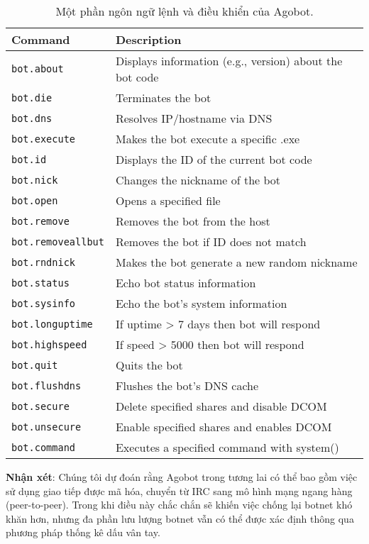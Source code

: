 \begin{table}[ht!]
	\caption{Một phần ngôn ngữ lệnh và điều khiển của Agobot.}
	\label{table:botcmd}
	\centering
	\footnotesize
	\begin{tabular}{l l}
		\toprule
		\textbf{Command} &
		\textbf{Description} \\
		\midrule
		\texttt{bot.about} & Displays information (e.g., version) about the bot code \\
		\texttt{bot.die} & Terminates the bot \\
		\texttt{bot.dns} & Resolves IP/hostname via DNS \\
		\texttt{bot.execute} & Makes the bot execute a specific .exe \\
		\texttt{bot.id} & Displays the ID of the current bot code \\
		\texttt{bot.nick} & Changes the nickname of the bot \\
		\texttt{bot.open} & Opens a specified file \\
		\texttt{bot.remove} & Removes the bot from the host \\
		\texttt{bot.removeallbut} & Removes the bot if ID does not match \\
		\texttt{bot.rndnick} & Makes the bot generate a new random nickname \\
		\texttt{bot.status} & Echo bot status information \\
		\texttt{bot.sysinfo} & Echo the bot's system information \\
		\texttt{bot.longuptime} & If uptime > 7 days then bot will respond \\
		\texttt{bot.highspeed} & If speed > 5000 then bot will respond \\
		\texttt{bot.quit} & Quits the bot \\
		\texttt{bot.flushdns} & Flushes the bot's DNS cache \\
		\texttt{bot.secure} & Delete specified shares and disable DCOM \\
		\texttt{bot.unsecure} & Enable specified shares and enables DCOM \\
		\texttt{bot.command } & Executes a specified command with system() \\
		\bottomrule
	\end{tabular}
\end{table}

\textbf{Nhận xét}: Chúng tôi dự đoán rằng Agobot trong tương lai có thể bao gồm việc sử dụng giao tiếp được mã hóa,
chuyển từ IRC sang mô hình mạng ngang hàng (peer-to-peer).
Trong khi điều này chắc chắn sẽ khiến việc chống lại botnet khó khăn hơn,
nhưng đa phần lưu lượng botnet vẫn có thể được xác định thông qua phương pháp thống kê dấu vân tay.


